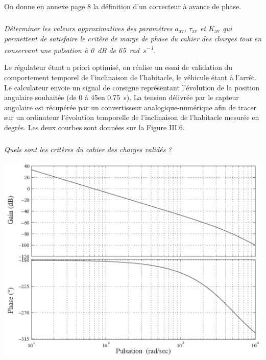 \documentclass[10pt,fleqn]{article} %
\begin{document}
\begin{multicols}{2}
On donne en annexe page 8 la définition d'un correcteur à avance de phase.

\subparagraph{}
\textit{Déterminer les valeurs approximatives des paramètres $a_{\text{av}}$, $\tau_{\text{av}}$ et $K_{\text{av}}$ qui permettent de satisfaire le critère de marge de phase du cahier des charges tout en conservant une pulsation à \SI{0}{dB} de \SI{65}{rad.s^{-1}}.}
\ifprof
\begin{corrige}
\end{corrige}
\else
\fi



Le régulateur étant a priori optimisé, on réalise un essai de validation du comportement temporel de l'inclinaison de l'habitacle, le véhicule étant à l'arrêt. Le calculateur envoie un signal de consigne représentant l'évolution de la position angulaire souhaitée (de 0 à 45\degres en \SI{0,75}{s}). La tension délivrée par le capteur angulaire est récupérée par un convertisseur analogique-numérique afin de tracer sur un ordinateur l'évolution temporelle de l'inclinaison de l'habitacle mesurée en degrés. Les deux courbes sont données sur la Figure III.6.


\subparagraph{}
\textit{Quels sont les critères du cahier des charges validés ?}


\begin{minipage}[c]{.48\linewidth}
\begin{center}
\includegraphics[width=.95\linewidth]{images/pt_10}


\end{center}
\end{minipage}
\end{multicols}
\end{document}
